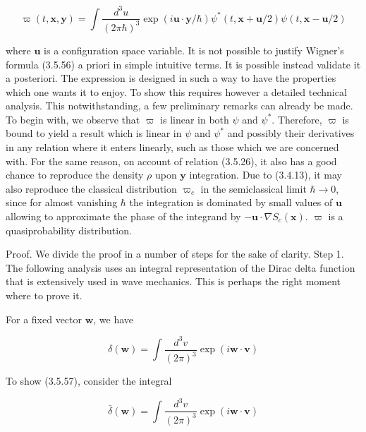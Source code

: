 \documentclass{article}
\begin{document}
\begin{equation*}
\varpi(t, \boldsymbol{x}, \boldsymbol{y})=\int \frac{d^{3} u}{(2 \pi \hbar)^{3}} \exp (i \boldsymbol{u} \cdot \boldsymbol{y} / \hbar) \psi^{*}(t, \boldsymbol{x}+\boldsymbol{u} / 2) \psi(t, \boldsymbol{x}-\boldsymbol{u} / 2) \tag{3.5.56}
\end{equation*}
 
where $\boldsymbol{u}$ is a configuration space variable. It is not possible to justify Wigner's formula (3.5.56) a priori in simple intuitive terms. It is possible instead validate it a posteriori. The expression is designed in such a way to have the properties which one wants it to enjoy. To show this requires however a detailed technical analysis. This notwithstanding, a few preliminary remarks can already be made. To begin with, we observe that $\varpi$ is linear in both $\psi$ and $\psi^{*}$. Therefore, $\varpi$ is bound to yield a result which is linear in $\psi$ and $\psi^{*}$ and possibly their derivatives
in any relation where it enters linearly, such as those which we are concerned with. For the same reason, on account of relation (3.5.26), it also has a good chance to reproduce the density $\rho$ upon $\boldsymbol{y}$ integration. Due to (3.4.13), it may also reproduce the classical distribution $\varpi_{c}$ in the semiclassical limit $\hbar \rightarrow 0$, since for almost vanishing $\hbar$ the integration is dominated by small values of $\boldsymbol{u}$ allowing to approximate the phase of the integrand by $-\boldsymbol{u} \cdot \nabla S_{c}(\boldsymbol{x})$.
$\varpi$ is a quasiprobability distribution.

Proof. We divide the proof in a number of steps for the sake of clarity.
Step 1. The following analysis uses an integral representation of the Dirac delta function that is extensively used in wave mechanics. This is perhaps the right moment where to prove it.

For a fixed vector $\boldsymbol{w}$, we have
 
\begin{equation*}
\delta(\boldsymbol{w})=\int \frac{d^{3} v}{(2 \pi)^{3}} \exp (i \boldsymbol{w} \cdot \boldsymbol{v}) \tag{3.5.57}
\end{equation*}
 

To show (3.5.57), consider the integral
 
\begin{equation*}
\bar{\delta}(\boldsymbol{w})=\int \frac{d^{3} v}{(2 \pi)^{3}} \exp (i \boldsymbol{w} \cdot \boldsymbol{v}) \tag{3.5.58}
\end{equation*}
 
\end{document}
